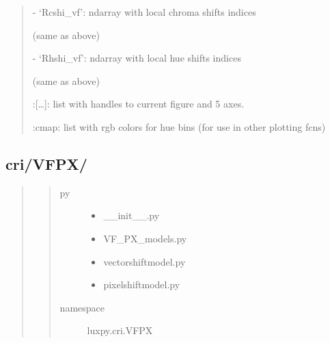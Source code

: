 \documentclass[letterpaper,10pt,english]{sphinxmanual}
\begin{document}
\begin{fulllineitems}
\begin{description}
\begin{quote}
\begin{description}
\begin{DUlineblock}{0em}
\begin{DUlineblock}{\DUlineblockindent}
\end{DUlineblock}
\item[] - ‘Rcshi\_vf’: ndarray with local chroma shifts indices 
\item[]
\begin{DUlineblock}{\DUlineblockindent}
\item[] (same as above)
\end{DUlineblock}
\item[] - ‘Rhshi\_vf’: ndarray with local hue shifts indices 
\item[]
\begin{DUlineblock}{\DUlineblockindent}
\item[] (same as above)
\item[] 
\end{DUlineblock}
\item[] :{[}…{]}: list with handles to current figure and 5 axes.
\item[] 
\item[] :cmap: list with rgb colors for hue bins 
(for use in other plotting fcns)
\end{DUlineblock}

\end{description}\end{quote}

\end{description}

\end{fulllineitems}



\subsection{cri/VFPX/}
\label{\detokenize{color:cri-vfpx}}\begin{quote}
\begin{quote}\begin{description}
\item[{py}] \leavevmode\begin{itemize}
\item {} 
\_\_init\_\_.py

\item {} 
VF\_PX\_models.py

\item {} 
vectorshiftmodel.py

\item {} 
pixelshiftmodel.py

\end{itemize}

\item[{namespace}] \leavevmode
luxpy.cri.VFPX

\end{description}\end{quote}
\end{quote}
\label{\detokenize{color:module-luxpy.color.cri.VFPX}}
\end{document}
